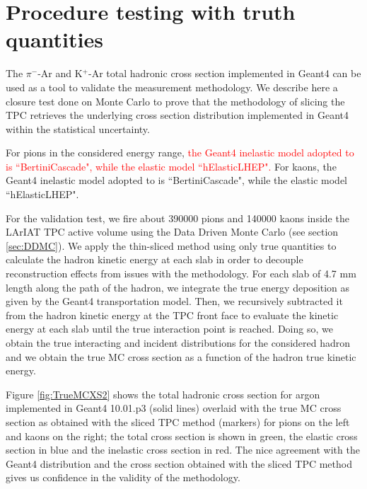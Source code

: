 \section{Procedure testing with truth quantities}\label{ch:procedureTesting}
The $\pi^{-}$-Ar and K$^{+}$-Ar total hadronic cross section implemented in Geant4 can be used as a tool to validate the measurement methodology.  We describe here a closure test done on Monte Carlo to prove that the methodology of slicing the TPC retrieves the underlying cross section distribution implemented in Geant4 within the statistical uncertainty. %

For pions in the considered energy range, \textcolor{red}{the Geant4 inelastic model adopted to is ``BertiniCascade", while the elastic model ``hElasticLHEP".}
For kaons, the Geant4 inelastic model adopted to is ``BertiniCascade", while the elastic model ``hElasticLHEP".  


For the validation test, we fire about 390000 pions and 140000 kaons inside the LArIAT TPC active volume using the Data Driven Monte Carlo (see section \ref{sec:DDMC}). We apply  the thin-sliced method using only true quantities to calculate the hadron kinetic energy at each slab in order to decouple reconstruction effects from issues with the methodology.  For each slab of 4.7 mm length along the path of the hadron, we integrate the true energy deposition as given by the Geant4 transportation model. Then, we recursively subtracted it from the hadron kinetic energy at the TPC front face to evaluate the kinetic energy at each slab until the true interaction point is reached. Doing so, we obtain the true interacting and incident distributions for the considered hadron and we obtain the true MC cross section as a function of the hadron true kinetic energy. 

Figure \ref{fig:TrueMCXS2} shows the total hadronic cross section for argon implemented in Geant4 10.01.p3 (solid lines) overlaid with the true MC cross section as obtained with the sliced TPC method (markers) for pions on the left and kaons on the right; the total cross section is shown in green,  the elastic cross section in blue and the inelastic cross section in red.  The nice agreement with the Geant4 distribution and the cross section  obtained with the sliced TPC method gives us confidence in the  validity of the methodology. 
        

